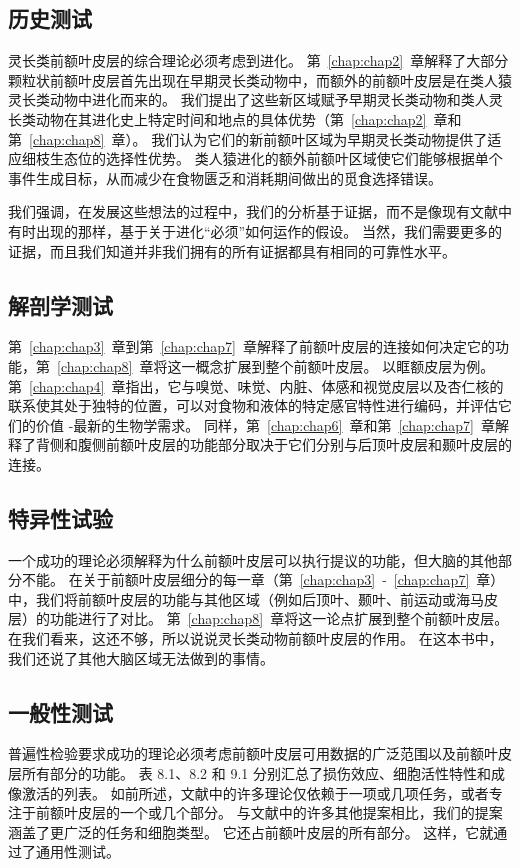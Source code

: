 \subsection{历史测试}
灵长类前额叶皮层的综合理论必须考虑到进化。 第~\ref{chap:chap2}~章解释了大部分颗粒状前额叶皮层首先出现在早期灵长类动物中，而额外的前额叶皮层是在类人猿灵长类动物中进化而来的。 我们提出了这些新区域赋予早期灵长类动物和类人灵长类动物在其进化史上特定时间和地点的具体优势（第~\ref{chap:chap2}~章和第~\ref{chap:chap8}~章）。 我们认为它们的新前额叶区域为早期灵长类动物提供了适应细枝生态位的选择性优势。 类人猿进化的额外前额叶区域使它们能够根据单个事件生成目标，从而减少在食物匮乏和消耗期间做出的觅食选择错误。
\par 
我们强调，在发展这些想法的过程中，我们的分析基于证据，而不是像现有文献中有时出现的那样，基于关于进化“必须”如何运作的假设。 当然，我们需要更多的证据，而且我们知道并非我们拥有的所有证据都具有相同的可靠性水平。
\subsection{解剖学测试}
第~\ref{chap:chap3}~章到第~\ref{chap:chap7}~章解释了前额叶皮层的连接如何决定它的功能，第~\ref{chap:chap8}~章将这一概念扩展到整个前额叶皮层。 以眶额皮层为例。 第~\ref{chap:chap4}~章指出，它与嗅觉、味觉、内脏、体感和视觉皮层以及杏仁核的联系使其处于独特的位置，可以对食物和液体的特定感官特性进行编码，并评估它们的价值 -最新的生物学需求。 同样，第~\ref{chap:chap6}~章和第~\ref{chap:chap7}~章解释了背侧和腹侧前额叶皮层的功能部分取决于它们分别与后顶叶皮层和颞叶皮层的连接。
\subsection{特异性试验} 
一个成功的理论必须解释为什么前额叶皮层可以执行提议的功能，但大脑的其他部分不能。 在关于前额叶皮层细分的每一章（第~\ref{chap:chap3}~-~\ref{chap:chap7}~章）中，我们将前额叶皮层的功能与其他区域（例如后顶叶、颞叶、前运动或海马皮层）的功能进行了对比。 第~\ref{chap:chap8}~章将这一论点扩展到整个前额叶皮层。 在我们看来，这还不够，所以说说灵长类动物前额叶皮层的作用。 在这本书中，我们还说了其他大脑区域无法做到的事情。
\subsection{一般性测试}
普遍性检验要求成功的理论必须考虑前额叶皮层可用数据的广泛范围以及前额叶皮层所有部分的功能。 表 8.1、8.2 和 9.1 分别汇总了损伤效应、细胞活性特性和成像激活的列表。 如前所述，文献中的许多理论仅依赖于一项或几项任务，或者专注于前额叶皮层的一个或几个部分。 与文献中的许多其他提案相比，我们的提案涵盖了更广泛的任务和细胞类型。 它还占前额叶皮层的所有部分。 这样，它就通过了通用性测试。
